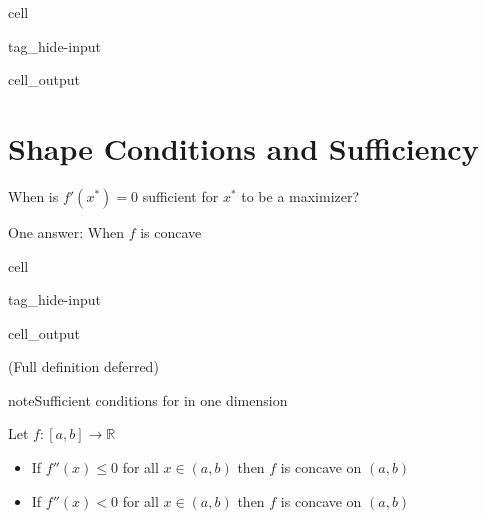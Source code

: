 \documentclass[letterpaper,10pt,english]{jupyterBook}
\begin{document}
\begin{sphinxuseclass}{cell}
\begin{sphinxuseclass}{tag_hide-input}\begin{sphinxVerbatimOutput}

\begin{sphinxuseclass}{cell_output}

\end{sphinxuseclass}\end{sphinxVerbatimOutput}

\end{sphinxuseclass}
\end{sphinxuseclass}

\section{Shape Conditions and Sufficiency}
\label{\detokenize{02.optimization_intro:shape-conditions-and-sufficiency}}
\sphinxAtStartPar
When is \(f'(x^*) = 0\) sufficient for \(x^*\) to be a maximizer?

\sphinxAtStartPar
One answer: When \(f\) is concave

\begin{sphinxuseclass}{cell}
\begin{sphinxuseclass}{tag_hide-input}\begin{sphinxVerbatimOutput}

\begin{sphinxuseclass}{cell_output}

\end{sphinxuseclass}\end{sphinxVerbatimOutput}

\end{sphinxuseclass}
\end{sphinxuseclass}
\sphinxAtStartPar
(Full definition deferred)

\begin{sphinxadmonition}{note}{Sufficient conditions for  in one dimension}

\sphinxAtStartPar
Let \(f \colon [a, b] \to \mathbb{R}\)
\begin{itemize}
\item {} 
\sphinxAtStartPar
If \(f''(x) \leq 0\) for all \(x \in (a, b)\) then \(f\) is concave on \((a, b)\)

\item {} 
\sphinxAtStartPar
If \(f''(x) < 0\) for all \(x \in (a, b)\) then \(f\) is  concave on \((a, b)\)

\end{itemize}
\end{sphinxadmonition}
\end{document}
